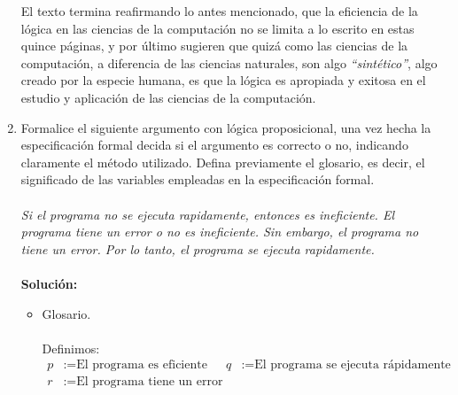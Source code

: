 \documentclass[8pt, letterpaper]{article}
\begin{document}
\begin{enumerate}
    \hspace*{1cm}El texto termina reafirmando lo antes mencionado, que la eficiencia de la lógica en las ciencias de la computación no se limita a lo escrito en estas quince páginas, y por último sugieren que quizá como las ciencias de la computación, a diferencia de las ciencias naturales, son algo \textit{``sintético''}, algo creado por la especie humana, es que la lógica es apropiada y exitosa en el estudio y aplicación de las ciencias de la computación. 
  \rmfamily
  \newpage
\item Formalice el siguiente argumento con lógica proposicional, una vez hecha la especificación formal decida si el argumento es correcto o no, indicando claramente el método utilizado. Defina previamente el glosario, es decir, el significado de las variables empleadas en la especificación formal.\\\\
  \textsl{Si el programa no se ejecuta rapidamente, entonces es ineficiente. El programa tiene un error o no es ineficiente. Sin embargo, el programa no tiene un error. Por lo tanto, el programa se ejecuta rapidamente.}\\\\
  \ttfamily
  \textbf{Solución:}
  \begin{itemize}
  \item Glosario.\\\\
    Definimos:
    \begin{align*}
      p &:= \text{El programa es eficiente} & q &:= \text{El programa se ejecuta rápidamente} \\
      r &:= \text{El programa tiene un error}
    \end{align*}
\end{itemize}
\end{enumerate}
\end{document}
